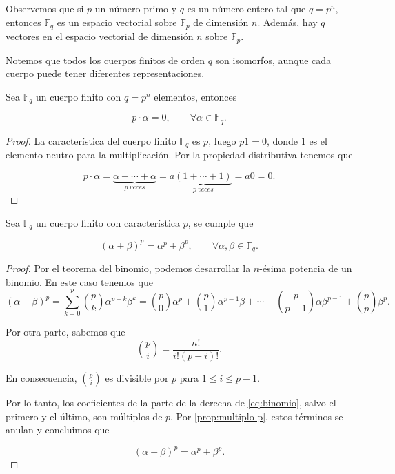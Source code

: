 Observemos que si $p$ un número primo y $q$ es un número entero tal que $q = p^n$, entonces $\mathbb{F}_q$ es un espacio vectorial sobre $\mathbb{F}_p$ de dimensión $n$. Además, hay $q$ vectores en el espacio vectorial de dimensión $n$ sobre $\mathbb{F}_p$.

Notemos que todos los cuerpos finitos de orden $q$ son isomorfos, aunque cada cuerpo puede tener diferentes representaciones.

\begin{proposition}
    \label{prop:multiplo-p}
    Sea $\mathbb{F}_q$ un cuerpo finito con $q = p^n$ elementos, entonces 

    $$p \cdot \alpha = 0, \qquad \forall \alpha \in \mathbb{F}_q.$$
\end{proposition}

\begin{proof}
    La característica del cuerpo finito $\mathbb{F}_q$ es $p$, luego $p1 = 0$, donde $1$ es el elemento neutro para la multiplicación. Por la propiedad distributiva tenemos que

    $$p \cdot \alpha = \underbrace{\alpha + \cdots + \alpha}_{p\ veces} = a \underbrace{(1 + \cdots + 1)}_{p\ veces} = a0 = 0.$$
\end{proof}

\begin{proposition}
    Sea $\mathbb{F}_q$ un cuerpo finito con característica $p$, se cumple que

    $$( \alpha + \beta )^p = \alpha^p + \beta^p, \qquad \forall \alpha, \beta \in \mathbb{F}_q.$$
\end{proposition}

\begin{proof}
    Por el teorema del binomio, podemos desarrollar la $n$-ésima potencia de un binomio. En este caso tenemos que
    \begin{equation}
        \label{eq:binomio}
        ( \alpha + \beta )^p
            =\sum_{k=0}^p {p \choose k}\alpha^{p-k} \beta^k
            ={p \choose 0}\alpha^p + {p\choose 1} \alpha^{p-1} \beta + \cdots + {p\choose p-1}\alpha \beta^{p-1} + {p \choose p} \beta^p.
    \end{equation}

    Por otra parte, sabemos que
    $${p \choose i} = \frac{n!}{i! (p-i)!}.$$

    En consecuencia, ${p \choose i}$ es divisible por $p$ para $1 \leq i \leq p-1$.

    Por lo tanto, los coeficientes de la parte de la derecha de \eqref{eq:binomio}, salvo el primero y el último, son múltiplos de $p$. Por \ref{prop:multiplo-p}, estos términos se anulan y concluimos que

    \begin{equation}
        ( \alpha + \beta )^p = \alpha^p + \beta^p.
    \end{equation}
    
\end{proof}


